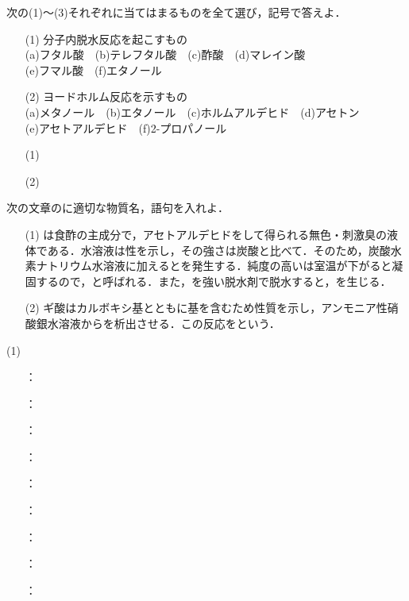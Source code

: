 \documentclass[a4paper,12pt]{ltjsreport}
\begin{document}
\begin{que}
次の(1)〜(3)それぞれに当てはまるものを全て選び，記号で答えよ．
\begin{itemize}
    \item [(1)]分子内脱水反応を起こすもの\\
    (a)フタル酸　(b)テレフタル酸　(c)酢酸　(d)マレイン酸　\\(e)フマル酸　(f)エタノール
    \item[(2)]ヨードホルム反応を示すもの\\
     (a)メタノール　(b)エタノール　(c)ホルムアルデヒド　(d)アセトン\\
     (e)アセトアルデヒド　(f)2-プロパノール
\end{itemize}
\end{que}
\ans 
\begin{itemize}
    \item [(1)]　\\[20pt]
    \item [(2)]
\end{itemize}
\newpage
\begin{que}
次の文章の\fbox{　}に適切な物質名，語句を入れよ．
\begin{itemize}
    \item[(1)] は食酢の主成分で，アセトアルデヒドをして得られる無色・刺激臭の液体である．水溶液は性を示し，その強さは炭酸と比べて．そのため，炭酸水素ナトリウム水溶液に加えるとを発生する．純度の高いは室温が下がると凝固するので，と呼ばれる．また，を強い脱水剤で脱水すると，を生じる．
    \item [(2)]ギ酸はカルボキシ基とともに基を含むため性質を示し，アンモニア性硝酸銀水溶液からを析出させる．この反応をという．
\end{itemize}
\end{que}
\ans 
\begin{minipage}{0.5\linewidth}
\noindent (1)\begin{itemize}
   \item [\fbox{ア}]：\\
  \item [\fbox{イ}]：\\
  \item [\fbox{ウ}]：\\
  \item [\fbox{エ}]：\\
  \item [\fbox{オ}]：\\
  \item [\fbox{カ}]：\\
  \item [\fbox{キ}]：\\
  \item [\fbox{ク}]：\\
  \item [\fbox{ケ}]：
\end{itemize}
\end{minipage}
\end{document}
